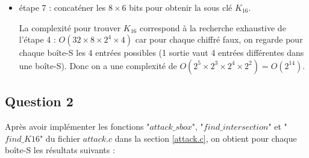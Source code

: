 \documentclass[11pt]{article}
\begin{document}
\begin{itemize}
	\item étape 7 : concaténer les $8 \times 6$ bits pour obtenir la sous clé $K_{16}$. \newline
	
	La complexité pour trouver $K_{16}$ correspond à la recherche exhaustive de l'étape 4 : \newline $O(32 \times 8 \times 2^4 \times 4)$ car pour chaque chiffré faux, on regarde pour chaque boîte-S les 4 entrées possibles (1 sortie vaut 4 entrées différentes dans une boîte-S). \newline Donc on a une complexité de $O(2^5 \times 2^3 \times 2^4 \times 2^2)=O(2^{14})$. 

\end{itemize}

\subsection{Question 2}

Après avoir implémenter les fonctions "$attack\_sbox$", "$find\_intersection$" et "$find\_K16$" du fichier $attack.c$ dans la section \ref{attack.c}, on obtient pour chaque boîte-S les résultats suivants : 
\end{document}
